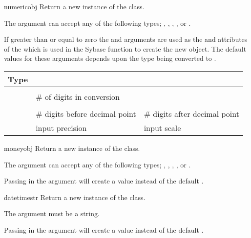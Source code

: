\begin{funcdesc}{numeric}{obj  }
Return a new instance of the  class.

The  argument can accept any of the following types;
, , , ,
or .

If greater than or equal to zero the  and 
arguments are used as the  and 
attributes of the  which is used in the Sybase
 function to create the new 
object.  The default values for these arguments depends upon the type
being converted to .

\begin{longtable}{l|l|l}
Type & \var{precision} & \var{scale} \\
\hline
\code{IntType}     & \code{16} & \code{0} \\
\code{LongType}    & \# of digits in \code{str()} conversion & \code{0} \\
\code{FloatType}   & \code{CS_MAX_PREC} & \code{12} \\
\code{StringType}  & \# digits before decimal point & \# digits after decimal point \\
\code{NumericType} & input precision & input scale \\
\end{longtable}
\end{funcdesc}

\begin{funcdesc}{money}{obj }
Return a new instance of the  class.

The  argument can accept any of the following types;
, , , ,
or .

Passing  in the  argument will create a
 value instead of the default .
\end{funcdesc}

\begin{funcdesc}{datetime}{str }
Return a new instance of the  class.

The  argument must be a string.

Passing  in the  argument will
create a  value instead of the default
.
\end{funcdesc}

